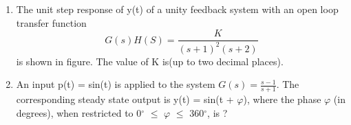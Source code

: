 \documentclass[journal,12pt,twocolumn]{IEEEtran}
\renewcommand\thesection{\arabic{section}}
\begin{document}
\begin{enumerate}[label=\arabic*.,ref=\thesection.\theenumi]
%
%
%    
%
%
%
\item
The unit step response of y(t) of a unity feedback system with an open loop transfer function  
\[ G(s)H(S)=\frac{K}{(s+1)^2(s+2)}  \]
is shown in figure. The value of K is(up to two decimal places).
%
%
%
%
%
\item
An input p(t) = sin(t) is applied to the system $G(s) = \frac{s-1}{s+1} $. The corresponding steady state output is y(t) = sin(t + $\varphi$), where the phase $\varphi$ (in degrees), when restricted to 0$^{\circ}$ $\leq$ $\varphi$ $\leq$ 360$^{\circ}$, is ?
%
%
%
%
%

\end{enumerate}
\end{document}

